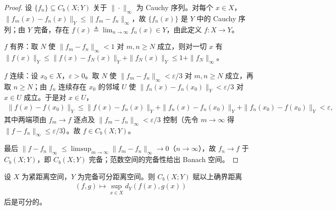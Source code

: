 \documentclass[../main.tex]{subfiles}
\begin{document}
\begin{proof}
设 $\{f_n\}\subseteq C_b(X;Y)$ 关于 $\|\cdot\|_\infty$ 为 Cauchy 序列。对每个 $x\in X$，$\|f_m(x)-f_n(x)\|_Y\leqslant\|f_m-f_n\|_\infty$，故 $\{f_n(x)\}$ 是 $Y$ 中的 Cauchy 序列；由 $Y$ 完备，存在 $f(x)\triangleq\lim_{n\to\infty}f_n(x)\in Y$，由此定义 $f:X\to Y$。

$f$ 有界：取 $N$ 使 $\|f_m-f_n\|_\infty<1$ 对 $m,n\geqslant N$ 成立，则对一切 $x$ 有 $\|f(x)\|_Y\leqslant\|f(x)-f_N(x)\|_Y+\|f_N(x)\|_Y\leqslant1+\|f_N\|_\infty$。

$f$ 连续：设 $x_0\in X$，$\varepsilon>0$。取 $N$ 使 $\|f_m-f_n\|_\infty<\varepsilon/3$ 对 $m,n\geqslant N$ 成立，再取 $n\geqslant N$；由 $f_n$ 连续存在 $x_0$ 的邻域 $U$ 使 $\|f_n(x)-f_n(x_0)\|_Y<\varepsilon/3$ 对 $x\in U$ 成立。于是对 $x\in U$，
\begin{align*}
\|f(x)-f(x_0)\|_Y\leqslant\|f(x)-f_n(x)\|_Y+\|f_n(x)-f_n(x_0)\|_Y+\|f_n(x_0)-f(x_0)\|_Y<\varepsilon,
\end{align*}
其中两端项由 $f_m\to f$ 逐点及 $\|f_m-f_n\|_\infty<\varepsilon/3$ 控制（先令 $m\to\infty$ 得 $\|f-f_n\|_\infty\leqslant\varepsilon/3$）。故 $f\in C_b(X;Y)$。

最后 $\|f-f_n\|_\infty\leqslant\limsup_{m\to\infty}\|f_m-f_n\|_\infty\to0$（$n\to\infty$），故 $f_n\to f$ 于 $C_b(X;Y)$，即 $C_b(X;Y)$ 完备；范数空间的完备性给出 Banach 空间。
\end{proof}

\begin{proposition}\label{proposition:appA-Cb可分}\label{proposition:appA-紧可分}
设 $X$ 为紧距离空间，$Y$ 为完备可分距离空间。则 $C_b(X;Y)$ 赋以上确界距离
\begin{align*}
(f,g)\mapsto\sup_{x\in X}d_Y(f(x),g(x))
\end{align*}
后是可分的。
\end{proposition}
\end{document}
